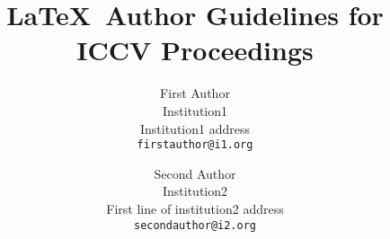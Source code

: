 \documentclass[10pt,twocolumn,letterpaper]{article}
\begin{document}
\title{\LaTeX\ Author Guidelines for ICCV Proceedings}

\author{First Author\\
Institution1\\
Institution1 address\\
{\tt\small firstauthor@i1.org}
\and
Second Author\\
Institution2\\
First line of institution2 address\\
{\tt\small secondauthor@i2.org}
}

\maketitle








\end{document}
